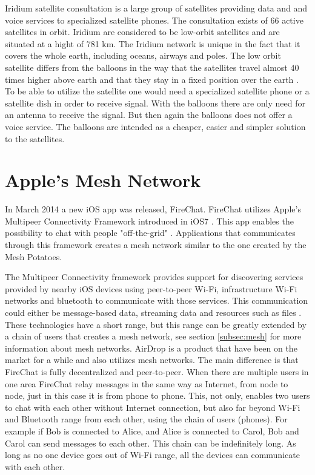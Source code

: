 Iridium satellite consultation is a large group of satellites providing data and and voice services to specialized satellite phones. The consultation exists of 66 active satellites in orbit. Iridium are considered to be low-orbit satellites and are situated at a hight of 781 km. The Iridium network is unique in the fact that it covers the whole earth, including oceans, airways and poles. The low orbit satellite differs from the balloons in the way that the satellites travel almost 40 times higher above earth and that they stay in a fixed position over the earth \cite{iridium}. To be able to utilize the satellite one would need a specialized satellite phone or a satellite dish in order to receive signal. With the balloons there are only need for an antenna to receive the signal. But then again the balloons does not offer a voice service. The balloons are intended as a cheaper, easier and simpler solution to the satellites.                                         

\section{Apple's Mesh Network}
In March 2014 a new iOS app was released, FireChat. FireChat utilizes Apple's Multipeer Connectivity Framework introduced in iOS7 \cite{appleMesh}. This app enables the possibility to chat with people "off-the-grid" \cite{fireChat}. Applications that communicates through this framework creates a mesh network similar to the one created by the Mesh Potatoes. 

The Multipeer Connectivity framework provides support for discovering services provided by nearby iOS devices using peer-to-peer Wi-Fi, infrastructure Wi-Fi networks and bluetooth to communicate with those services. This communication could either be message-based data, streaming data and resources such as files \cite{multipeer}. These technologies have a short range, but this range can be greatly extended by a chain of users that creates a mesh network, see section \ref{subsec:mesh} for more information about mesh networks. AirDrop is a product that have been on the market for a while and also utilizes mesh networks. The main difference is that FireChat is fully decentralized and peer-to-peer. When there are multiple users in one area FireChat relay messages in the same way as Internet, from node to node, just in this case it is from phone to phone.  This, not only, enables two users to chat with each other without Internet connection, but also far beyond Wi-Fi and Bluetooth range from each other, using the chain of users (phones). For example if Bob is connected to Alice, and Alice is connected to Carol, Bob and Carol can send messages to each other. This chain can be indefinitely long. As long as no one device goes out of Wi-Fi range, all the devices can communicate with each other. 

